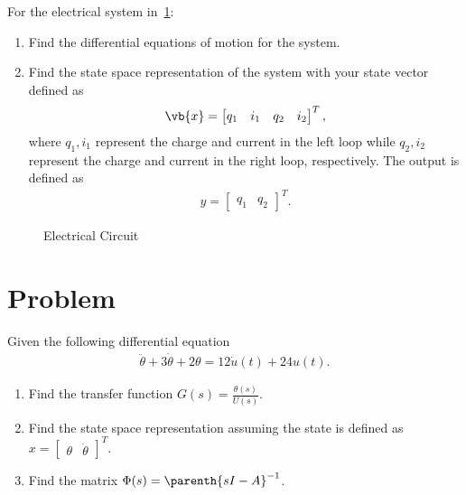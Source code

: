 \documentclass[titlepage, 11pt, reqno]{article}    %
\begin{document}
For the electrical system in~\cref{fig:elec_circuit_2}:
\begin{enumerate}
    \item Find the differential equations of motion for the system.
    \item Find the state space representation of the system with your state vector defined as
        \begin{align*}
        \vb{x} = \begin{bmatrix}q_1 & i_1 & q_2 & i_2\end{bmatrix}^T,
        \end{align*}
        where \(q_1, i_1\) represent the charge and current in the left loop while \(q_2, i_2\) represent the charge and current in the right loop, respectively. 
        The output is defined as
        \begin{align*}
        y = \begin{bmatrix} q_1 & q_2 \end{bmatrix}^T.
        \end{align*}
\end{enumerate}
\begin{figure}[htbp]
\centering
\begin{scaletikzpicturetowidth}{0.8\textwidth}
\end{scaletikzpicturetowidth}
\caption{Electrical Circuit~\label{fig:elec_circuit_2}}
\end{figure}
\clearpage
\newpage
\mbox{}
\clearpage

\section{Problem}
Given the following differential equation
\begin{align*}
    \ddot{\theta} + 3 \dot{\theta} + 2 \theta = 12 \dot{u}(t) + 24 u(t).
\end{align*}

\begin{enumerate}
    \item Find the transfer function \( G(s) = \frac{\theta(s)}{U(s)} \).
    \item Find the state space representation assuming the state is  defined as \( x = \begin{bmatrix} \theta & \dot{\theta}\end{bmatrix}^T\).
    \item Find the matrix \( \Phi(s) = \parenth{sI - A}^{-1}\).
\end{enumerate}
\clearpage\newpage
\mbox{}
\clearpage

\end{document}
